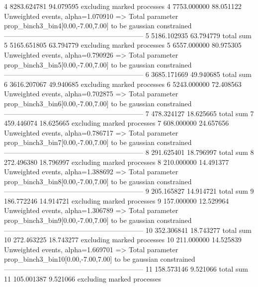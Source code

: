 4          8283.624781     94.079595       excluding marked processes    
4          7753.000000     88.051122       Unweighted events, alpha=1.070910
  => Total parameter prop_binch3_bin4[0.00,-7.00,7.00] to be gaussian constrained
------------------------------------------------------------
5          5186.102935     63.794779       total sum                     
5          5165.651805     63.794779       excluding marked processes    
5          6557.000000     80.975305       Unweighted events, alpha=0.790926
  => Total parameter prop_binch3_bin5[0.00,-7.00,7.00] to be gaussian constrained
------------------------------------------------------------
6          3685.171669     49.940685       total sum                     
6          3616.207067     49.940685       excluding marked processes    
6          5243.000000     72.408563       Unweighted events, alpha=0.702875
  => Total parameter prop_binch3_bin6[0.00,-7.00,7.00] to be gaussian constrained
------------------------------------------------------------
7          478.324127      18.625665       total sum                     
7          459.446074      18.625665       excluding marked processes    
7          608.000000      24.657656       Unweighted events, alpha=0.786717
  => Total parameter prop_binch3_bin7[0.00,-7.00,7.00] to be gaussian constrained
------------------------------------------------------------
8          291.625401      18.796997       total sum                     
8          272.496380      18.796997       excluding marked processes    
8          210.000000      14.491377       Unweighted events, alpha=1.388692
  => Total parameter prop_binch3_bin8[0.00,-7.00,7.00] to be gaussian constrained
------------------------------------------------------------
9          205.165827      14.914721       total sum                     
9          186.772246      14.914721       excluding marked processes    
9          157.000000      12.529964       Unweighted events, alpha=1.306789
  => Total parameter prop_binch3_bin9[0.00,-7.00,7.00] to be gaussian constrained
------------------------------------------------------------
10         352.306841      18.743277       total sum                     
10         272.463225      18.743277       excluding marked processes    
10         211.000000      14.525839       Unweighted events, alpha=1.669701
  => Total parameter prop_binch3_bin10[0.00,-7.00,7.00] to be gaussian constrained
------------------------------------------------------------
11         158.573146      9.521066        total sum                     
11         105.001387      9.521066        excluding marked processes    
